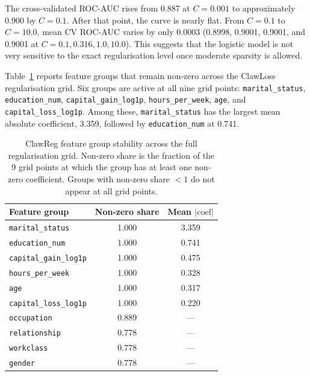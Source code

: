 \documentclass[11pt]{article}
\begin{document}
The cross-validated ROC-AUC rises from 0.887 at $C = 0.001$ to approximately 0.900 by $C = 0.1$. After that point, the curve is nearly flat. From $C = 0.1$ to $C = 10.0$, mean CV ROC-AUC varies by only 0.0003 (0.8998, 0.9001, 0.9001, and 0.9001 at $C = 0.1, 0.316, 1.0, 10.0$). This suggests that the logistic model is not very sensitive to the exact regularisation level once moderate sparsity is allowed.

Table~\ref{tab:stablefeatures} reports feature groups that remain non-zero across the ClawLoss regularisation grid. Six groups are active at all nine grid points: \texttt{marital\_status}, \texttt{education\_num}, \texttt{capital\_gain\_log1p}, \texttt{hours\_per\_week}, \texttt{age}, and \texttt{capital\_loss\_log1p}. Among these, \texttt{marital\_status} has the largest mean absolute coefficient, 3.359, followed by \texttt{education\_num} at 0.741.

\begin{table}[!ht]
  \centering
  \footnotesize
  \setlength{\tabcolsep}{5pt}
  \begin{tabular}{lcc}
    \toprule
    \textbf{Feature group}     & \textbf{Non-zero share} & \textbf{Mean $|\text{coef}|$} \\
    \midrule
    \texttt{marital\_status}       & 1.000 & 3.359 \\
    \texttt{education\_num}        & 1.000 & 0.741 \\
    \texttt{capital\_gain\_log1p}  & 1.000 & 0.475 \\
    \texttt{hours\_per\_week}      & 1.000 & 0.328 \\
    \texttt{age}                   & 1.000 & 0.317 \\
    \texttt{capital\_loss\_log1p}  & 1.000 & 0.220 \\
    \texttt{occupation}            & 0.889 & ---   \\
    \texttt{relationship}          & 0.778 & ---   \\
    \texttt{workclass}             & 0.778 & ---   \\
    \texttt{gender}                & 0.778 & ---   \\
    \bottomrule
  \end{tabular}
  \caption{ClawReg feature group stability across the full
    regularisation grid.  Non-zero share is the fraction of the
    9 grid points at which the group has at least one non-zero
    coefficient.  Groups with non-zero share $< 1$ do not
    appear at all grid points.}
  \label{tab:stablefeatures}
\end{table}
\end{document}
